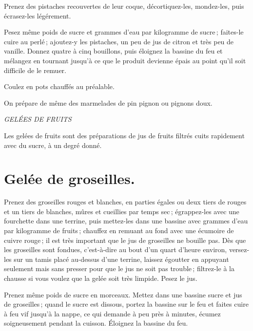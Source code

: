 Prenez des pistaches recouvertes de leur coque, décortiquez-les, mondez-les,
puis écrasez-les légérement.

Pesez même poids de sucre et {\mmm} grammes d'eau par kilogramme de
sucre ; faites-le cuire au perlé ; ajoutez-y les pistaches, un peu de jus de
citron et très peu de vanille. Donnez quatre à cinq bouillons, puis éloignez la
bassine du feu et mélangez en tournant jusqu'à ce que le produit devienne épais
au point qu'il soit difficile de le remuer.

Coulez en pots chauffés au préalable.

\sk

On prépare de même des marmelades de pin pignon ou pignons doux.

\bigskip

\begin{center}
\textit{GELÉES DE FRUITS}
\end{center}

\bigskip

Les gelées de fruits sont des préparations de jus de fruits filtrés cuits
rapidement avec du sucre, à un degré donné.

\section*{\centering Gelée de groseilles.}
{}

Prenez des groseilles rouges et blanches, en parties égales ou deux tiers de
rouges et un tiers de blanches, mûres et cueillies par temps sec ; égrappez-les
avec une fourchette dans une terrine, puis mettez-les dans une bassine avec
{\mmm} grammes d'eau par kilogramme de fruits ; chauffez en remuant au
fond avec une écumoire de cuivre rouge ; il est très important que le jus de
groseilles ne bouille pas. Dès que les groseilles sont fondues, c'est-à-dire au
bout d'un quart d'heure environ, versez-les sur un tamis placé au-dessus d'une
terrine, laissez égoutter en appuyant seulement mais sans presser pour que le
jus ne soit pas trouble ; filtrez-le à la chausse si vous voulez que la gelée
soit très limpide. Pesez le jus.

Prenez même poids de sucre en morceaux. Mettez dans une bassine sucre et jus de
groseilles ; quand le sucre est dissous, portez la bassine sur le feu et faites
cuire à feu vif jusqu'à la nappe, ce qui demande à peu près {\mmm}
à {\mmm} minutes, écumez soigneusement pendant la cuisson. Éloignez la
bassine du feu.

